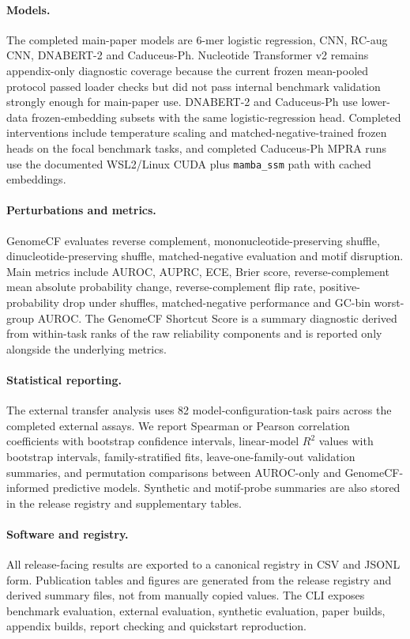 \documentclass[11pt]{article}
\begin{document}
\paragraph{Models.}
The completed main-paper models are 6-mer logistic regression, CNN, RC-aug CNN, DNABERT-2 and Caduceus-Ph. Nucleotide Transformer v2 remains appendix-only diagnostic coverage because the current frozen mean-pooled protocol passed loader checks but did not pass internal benchmark validation strongly enough for main-paper use. DNABERT-2 and Caduceus-Ph use lower-data frozen-embedding subsets with the same logistic-regression head. Completed interventions include temperature scaling and matched-negative-trained frozen heads on the focal benchmark tasks, and completed Caduceus-Ph MPRA runs use the documented WSL2/Linux CUDA plus \texttt{mamba\_ssm} path with cached embeddings.

\paragraph{Perturbations and metrics.}
GenomeCF evaluates reverse complement, mononucleotide-preserving shuffle, dinucleotide-preserving shuffle, matched-negative evaluation and motif disruption. Main metrics include AUROC, AUPRC, ECE, Brier score, reverse-complement mean absolute probability change, reverse-complement flip rate, positive-probability drop under shuffles, matched-negative performance and GC-bin worst-group AUROC. The GenomeCF Shortcut Score is a summary diagnostic derived from within-task ranks of the raw reliability components and is reported only alongside the underlying metrics.

\paragraph{Statistical reporting.}
The external transfer analysis uses 82 model-configuration-task pairs across the completed external assays. We report Spearman or Pearson correlation coefficients with bootstrap confidence intervals, linear-model $R^2$ values with bootstrap intervals, family-stratified fits, leave-one-family-out validation summaries, and permutation comparisons between AUROC-only and GenomeCF-informed predictive models. Synthetic and motif-probe summaries are also stored in the release registry and supplementary tables.

\paragraph{Software and registry.}
All release-facing results are exported to a canonical registry in CSV and JSONL form. Publication tables and figures are generated from the release registry and derived summary files, not from manually copied values. The CLI exposes benchmark evaluation, external evaluation, synthetic evaluation, paper builds, appendix builds, report checking and quickstart reproduction.
\end{document}
